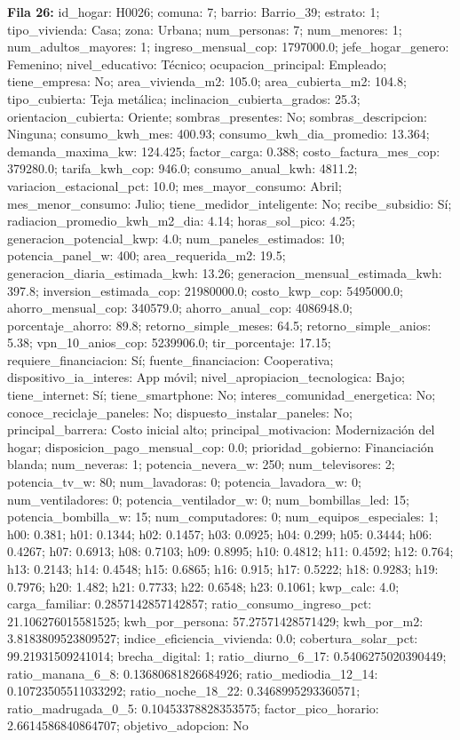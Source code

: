 {\footnotesize\textbf{Fila 26:} id\_hogar: H0026; comuna: 7; barrio: Barrio\_39; estrato: 1; tipo\_vivienda: Casa; zona: Urbana; num\_personas: 7; num\_menores: 1; num\_adultos\_mayores: 1; ingreso\_mensual\_cop: 1797000.0; jefe\_hogar\_genero: Femenino; nivel\_educativo: Técnico; ocupacion\_principal: Empleado; tiene\_empresa: No; area\_vivienda\_m2: 105.0; area\_cubierta\_m2: 104.8; tipo\_cubierta: Teja metálica; inclinacion\_cubierta\_grados: 25.3; orientacion\_cubierta: Oriente; sombras\_presentes: No; sombras\_descripcion: Ninguna; consumo\_kwh\_mes: 400.93; consumo\_kwh\_dia\_promedio: 13.364; demanda\_maxima\_kw: 124.425; factor\_carga: 0.388; costo\_factura\_mes\_cop: 379280.0; tarifa\_kwh\_cop: 946.0; consumo\_anual\_kwh: 4811.2; variacion\_estacional\_pct: 10.0; mes\_mayor\_consumo: Abril; mes\_menor\_consumo: Julio; tiene\_medidor\_inteligente: No; recibe\_subsidio: Sí; radiacion\_promedio\_kwh\_m2\_dia: 4.14; horas\_sol\_pico: 4.25; generacion\_potencial\_kwp: 4.0; num\_paneles\_estimados: 10; potencia\_panel\_w: 400; area\_requerida\_m2: 19.5; generacion\_diaria\_estimada\_kwh: 13.26; generacion\_mensual\_estimada\_kwh: 397.8; inversion\_estimada\_cop: 21980000.0; costo\_kwp\_cop: 5495000.0; ahorro\_mensual\_cop: 340579.0; ahorro\_anual\_cop: 4086948.0; porcentaje\_ahorro: 89.8; retorno\_simple\_meses: 64.5; retorno\_simple\_anios: 5.38; vpn\_10\_anios\_cop: 5239906.0; tir\_porcentaje: 17.15; requiere\_financiacion: Sí; fuente\_financiacion: Cooperativa; dispositivo\_ia\_interes: App móvil; nivel\_apropiacion\_tecnologica: Bajo; tiene\_internet: Sí; tiene\_smartphone: No; interes\_comunidad\_energetica: No; conoce\_reciclaje\_paneles: No; dispuesto\_instalar\_paneles: No; principal\_barrera: Costo inicial alto; principal\_motivacion: Modernización del hogar; disposicion\_pago\_mensual\_cop: 0.0; prioridad\_gobierno: Financiación blanda; num\_neveras: 1; potencia\_nevera\_w: 250; num\_televisores: 2; potencia\_tv\_w: 80; num\_lavadoras: 0; potencia\_lavadora\_w: 0; num\_ventiladores: 0; potencia\_ventilador\_w: 0; num\_bombillas\_led: 15; potencia\_bombilla\_w: 15; num\_computadores: 0; num\_equipos\_especiales: 1; h00: 0.381; h01: 0.1344; h02: 0.1457; h03: 0.0925; h04: 0.299; h05: 0.3444; h06: 0.4267; h07: 0.6913; h08: 0.7103; h09: 0.8995; h10: 0.4812; h11: 0.4592; h12: 0.764; h13: 0.2143; h14: 0.4548; h15: 0.6865; h16: 0.915; h17: 0.5222; h18: 0.9283; h19: 0.7976; h20: 1.482; h21: 0.7733; h22: 0.6548; h23: 0.1061; kwp\_calc: 4.0; carga\_familiar: 0.2857142857142857; ratio\_consumo\_ingreso\_pct: 21.106276015581525; kwh\_por\_persona: 57.27571428571429; kwh\_por\_m2: 3.8183809523809527; indice\_eficiencia\_vivienda: 0.0; cobertura\_solar\_pct: 99.21931509241014; brecha\_digital: 1; ratio\_diurno\_6\_17: 0.5406275020390449; ratio\_manana\_6\_8: 0.13680681826684926; ratio\_mediodia\_12\_14: 0.10723505511033292; ratio\_noche\_18\_22: 0.3468995293360571; ratio\_madrugada\_0\_5: 0.10453378828353575; factor\_pico\_horario: 2.6614586840864707; objetivo\_adopcion: No\par}
